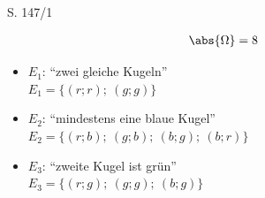 \begin{Exercise}{S. 147/1}{}
\begin{enumerate}
\begin{enumerate}[label=\alph*),leftmargin=*]
{\begin{minipage}[t]{0.55\linewidth}
\begin{align*}
                    \abs{\Omega} &= 8
                \end{align*}
                \begin{itemize}
                    \item {
                        $E_{1}$: ``zwei gleiche Kugeln''\\
                        $E_{1} = \{ (r; r); \ (g; g) \}$
                        }
                    \item {
                        $E_{2}$: ``mindestens eine blaue Kugel''\\
                        $E_{2} = \{ (r; b); \ (g; b); \ (b; g); \ (b; r) \}$
                        }
                    \item {
                        $E_{3}$: ``zweite Kugel ist grün''\\
                        $E_{3} = \{ (r; g); \ (g; g); \ (b; g) \}$
                    }
                \end{itemize}
            \end{minipage}
            }
    \end{enumerate}
\end{enumerate}
\end{Exercise}

